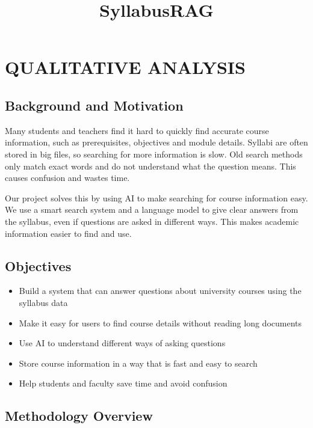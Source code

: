 \documentclass[conference]{IEEEtran}
\begin{document}
\title{SyllabusRAG}

\author{
\and
{}
}

\maketitle

\section{\textbf{QUALITATIVE ANALYSIS}}

\subsection{\textbf{Background and Motivation}}
Many students and teachers find it hard to quickly find accurate course information, such as prerequisites, objectives and module details. Syllabi are often stored in big files, so searching for more information is slow. Old search methods only match exact words and do not understand what the question means. This causes confusion and wastes time.

Our project solves this by using AI to make searching for course information easy. We use a smart search system and a language model to give clear answers from the syllabus, even if questions are asked in different ways. This makes academic information easier to find and use.

\subsection{\textbf{Objectives}}
\begin{itemize}
    \item Build a system that can answer questions about university courses using the syllabus data
    \item Make it easy for users to find course details without reading long documents
    \item Use AI to understand different ways of asking questions
    \item Store course information in a way that is fast and easy to search
    \item Help students and faculty save time and avoid confusion
\end{itemize}

\subsection{\textbf{Methodology Overview}}
\end{document}
